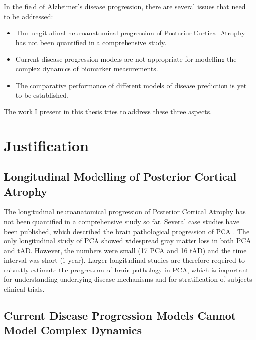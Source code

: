 In the field of Alzheimer's disease progression, there are several issues that need to be addressed:
\begin{itemize}
\item The longitudinal neuroanatomical progression of Posterior Cortical Atrophy has not been quantified in a comprehensive study.
\item Current disease progression models are not appropriate for modelling the complex dynamics of biomarker measurements.
\item The comparative performance of different models of disease prediction is yet to be established.
\end{itemize}

The work I present in this thesis tries to address these three aspects.

\section{Justification}

\subsection{Longitudinal Modelling of Posterior Cortical Atrophy}

The longitudinal neuroanatomical progression of Posterior Cortical Atrophy has not been quantified in a comprehensive study so far. Several case studies have been published, which described the brain pathological progression of PCA \cite{ross1996progressive, goethals2001posterior, giovagnoli2009neuropsychological, chang2015substance, kennedy2012visualizing, crutch2017consensus}. The only longitudinal study of PCA \cite{lehmann2012global} showed widespread gray matter loss in both PCA and tAD. However, the numbers were small (17 PCA and 16 tAD) and the time interval was short (1 year). Larger longitudinal studies are therefore required to robustly estimate the progression of brain pathology in PCA, which is important for understanding underlying disease mechanisms and for stratification of subjects clinical trials.

\subsection{Current Disease Progression Models Cannot Model Complex Dynamics}

